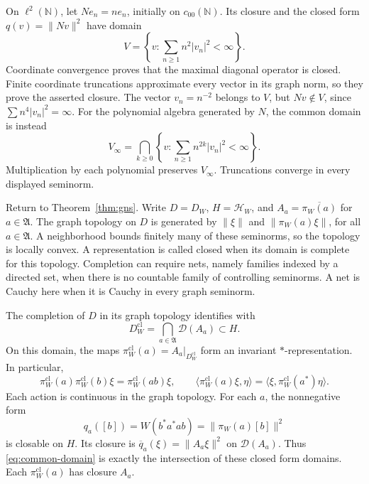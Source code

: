 \documentclass[11pt]{article}
\numberwithin{equation}{section}
\begin{document}
\begin{example}
\label{ex:maximal-domain}
On $\ell^2(\mathbb N)$, let $Ne_n=ne_n$, initially on $c_{00}(\mathbb N)$.
Its closure and the closed form $q(v)=\|Nv\|^2$ have domain
\[
 V=\left\{v:\sum_{n\geq1}n^2|v_n|^2<\infty\right\}.
\]
Coordinate convergence proves that the maximal diagonal operator is closed.
Finite coordinate truncations approximate every vector in its graph norm,
so they prove the asserted closure.  The vector $v_n=n^{-2}$ belongs to $V$,
but $Nv\notin V$, since $\sum n^4|v_n|^2=\infty$.
For the polynomial algebra generated by $N$, the common domain is instead
\begin{equation}
 V_\infty=\bigcap_{k\geq0}
 \left\{v:\sum_{n\geq1}n^{2k}|v_n|^2<\infty\right\}.
 \label{eq:all-moments}
\end{equation}
Multiplication by each polynomial preserves $V_\infty$.
Truncations converge in every displayed seminorm.
\end{example}

Return to Theorem~\ref{thm:gns}.  Write $D=D_W$, $H=\mathcal H_W$,
and $A_a=\overline{\pi_W(a)}$ for $a\in\mathfrak A$.
The graph topology on $D$ is generated by $\|\xi\|$ and
$\|\pi_W(a)\xi\|$, for all $a\in\mathfrak A$.
A neighborhood bounds finitely many of these seminorms, so the topology
is locally convex.  A representation is called closed when its domain is
complete for this topology.  Completion can require nets, namely families
indexed by a directed set, when there is no countable family of controlling
seminorms.  A net is Cauchy here when it is Cauchy in every graph seminorm.

\begin{theorem}
\label{thm:graph-domain}
The completion of $D$ in its graph topology identifies with
\begin{equation}
 D_W^{\mathrm{cl}}=\bigcap_{a\in\mathfrak A}\mathcal D(A_a)
 \subset H.
 \label{eq:common-domain}
\end{equation}
On this domain, the maps $\pi_W^{\mathrm{cl}}(a)=A_a|_{D_W^{\mathrm{cl}}}$
form an invariant $*$-representation.  In particular,
\begin{equation}
 \pi_W^{\mathrm{cl}}(a)\pi_W^{\mathrm{cl}}(b)\xi
 =\pi_W^{\mathrm{cl}}(ab)\xi,
 \qquad
 \langle\pi_W^{\mathrm{cl}}(a)\xi,\eta\rangle
 =\langle\xi,\pi_W^{\mathrm{cl}}(a^*)\eta\rangle.
 \label{eq:closed-products}
\end{equation}
Each action is continuous in the graph topology.
For each $a$, the nonnegative form
\[
 q_a([b])=W(b^*a^*ab)=\|\pi_W(a)[b]\|^2
\]
is closable on $H$.  Its closure is $\overline q_a(\xi)=\|A_a\xi\|^2$
on $\mathcal D(A_a)$.  Thus \eqref{eq:common-domain} is exactly the
intersection of these closed form domains.
Each $\pi_W^{\mathrm{cl}}(a)$ has closure $A_a$.
\end{theorem}
\end{document}
